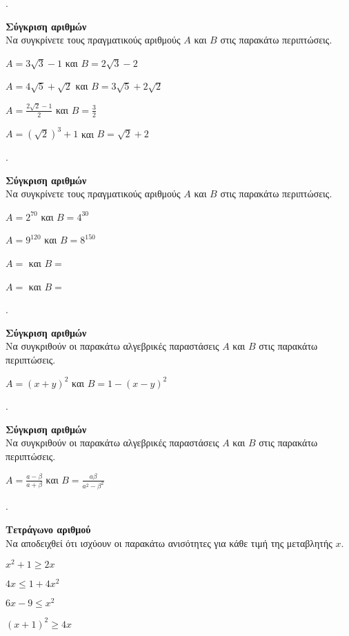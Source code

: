 \documentclass[11pt,a4paper,twocolumn]{article}
\newcounter{askhsh}
\newcommand{\askhsh}{\large\theaskhsh.\ \addtocounter{askhsh}{1}}
\begin{document}
\askhsh \textbf{Σύγκριση αριθμών}\\
Να συγκρίνετε τους πραγματικούς αριθμούς $ A $ και $ B $ στις παρακάτω περιπτώσεις.
\begin{rlist}
\item $ A=3\sqrt{3}-1 $ και $ B=2\sqrt{3}-2 $
\item $ A=4\sqrt{5}+\sqrt{2} $ και $ B=3\sqrt{5}+2\sqrt{2} $
\item $ A=\frac{2\sqrt{2}-1}{2} $ και $ B=\frac{3}{2} $
\item $ A=\left(\!\sqrt{2}\right)^3+1 $ και $ B=\sqrt{2}+2 $
\end{rlist}
\askhsh \textbf{Σύγκριση αριθμών}\\
Να συγκρίνετε τους πραγματικούς αριθμούς $ A $ και $ B $ στις παρακάτω περιπτώσεις.
\begin{rlist}
\item $ A=2^{70} $ και $ B=4^{30} $
\item $ A=9^{120} $ και $ B=8^{150} $
\item $ A= $ και $ B= $
\item $ A= $ και $ B= $
\end{rlist}
\askhsh \textbf{Σύγκριση αριθμών}\\
Να συγκριθούν οι παρακάτω αλγεβρικές παραστάσεις $ A $ και $ B $ στις παρακάτω περιπτώσεις.
\begin{rlist}
\item $ A=(x+y)^2 $ και $ B=1-(x-y)^2 $
\item 
\item 
\item 
\end{rlist}
\askhsh \textbf{Σύγκριση αριθμών}\\
Να συγκριθούν οι παρακάτω αλγεβρικές παραστάσεις $ A $ και $ B $ στις παρακάτω περιπτώσεις.
\begin{rlist}
\item $ A=\frac{a-\beta}{a+\beta} $ και $ B=\frac{a\beta}{a^2-\beta^2} $
\item 
\item 
\item 
\end{rlist}
\askhsh \textbf{Τετράγωνο αριθμού}\\
Να αποδειχθεί ότι ισχύουν οι παρακάτω ανισότητες για κάθε τιμή της μεταβλητής $ x $.
\begin{multicols}{2}
\begin{rlist}
\item $ x^2+1\geq 2x $
\item $ 4x\leq 1+4x^2 $
\item $ 6x-9\leq x^2 $
\item $ (x+1)^2\geq 4x $
\end{rlist}
\end{multicols}
\end{document}
